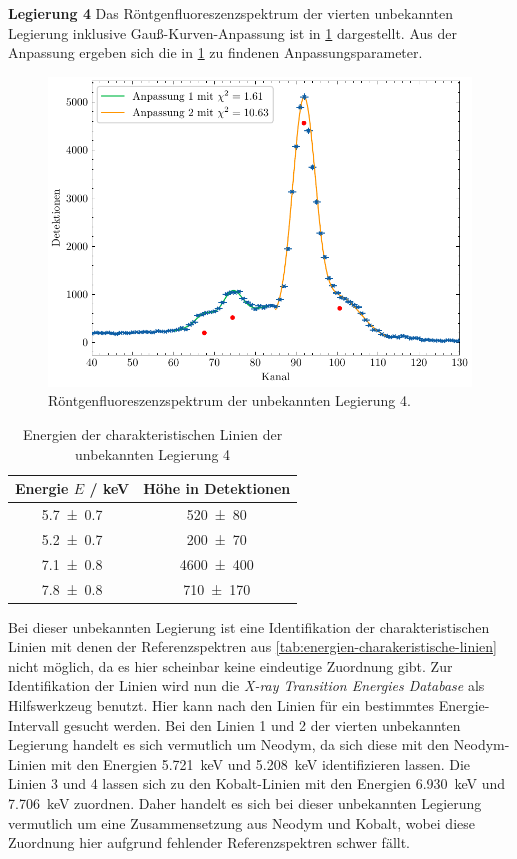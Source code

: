 \noindent\textbf{Legierung 4}\newline
Das Röntgenfluoreszenzspektrum der vierten unbekannten Legierung inklusive Gauß-Kurven-Anpassung ist in \cref{fig:unbekannt4} dargestellt. Aus der Anpassung ergeben sich die
in \cref{tab:unbekannt4} zu findenen Anpassungsparameter.
\begin{figure}[H]
	\centering
	\includegraphics[width=0.6\linewidth]{../figs/Unbekannt4.pdf}
	\caption{Röntgenfluoreszenzspektrum der unbekannten Legierung 4.}
	\label{fig:unbekannt4}
\end{figure}
\begin{table}[H]
    \centering
    \caption{Energien der charakteristischen Linien der unbekannten Legierung 4}
    \label{tab:unbekannt4}
    \begin{tabular}{c|c}
       Energie $E$ / \unit{\kilo\electronvolt} & Höhe in Detektionen \\
\hline
\num{5.7\pm 0.7} & \num{520\pm 80} \\ 
\num{5.2\pm 0.7} & \num{200\pm 70} \\ 
\num{7.1\pm 0.8} & \num{4600\pm 400} \\ 
\num{7.8\pm 0.8} & \num{710\pm 170} \\ 

    \end{tabular}
\end{table} Bei dieser unbekannten Legierung ist eine Identifikation der charakteristischen Linien mit denen der Referenzspektren aus \cref{tab:energien-charakeristische-linien}
nicht möglich, da es hier scheinbar keine eindeutige Zuordnung gibt. Zur Identifikation der Linien wird nun die \textit{X-ray Transition Energies Database} \cite{nist_xray_database}
als Hilfswerkzeug benutzt. Hier kann nach den Linien für ein bestimmtes Energie-Intervall gesucht werden. Bei den Linien 1 und 2 der vierten unbekannten Legierung
handelt es sich vermutlich um Neodym, da sich diese mit den Neodym-Linien mit den Energien \SI{5,721}{\kilo \electronvolt} und \SI{5,208}{\kilo \electronvolt}
identifizieren lassen. Die Linien 3 und 4 lassen sich zu den Kobalt-Linien mit den Energien \SI{6,930}{\kilo \electronvolt} und \SI{7,706}{\kilo \electronvolt}
zuordnen. Daher handelt es sich bei dieser unbekannten Legierung vermutlich um eine Zusammensetzung aus Neodym und Kobalt, wobei diese Zuordnung hier
aufgrund fehlender Referenzspektren schwer fällt.
